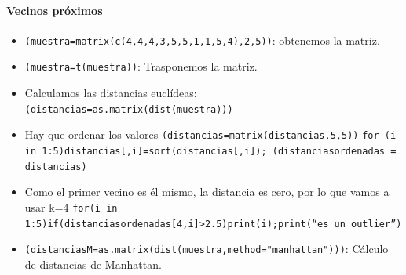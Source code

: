\documentclass[a4paper, 12pt]{article}
\begin{document}
	\paragraph{Vecinos próximos}
	\begin{itemize}
		\item \texttt{(muestra=matrix(c(4,4,4,3,5,5,1,1,5,4),2,5))}: obtenemos la matriz.
		\item \texttt{(muestra=t(muestra))}: Trasponemos la matriz.
		\item Calculamos las distancias euclídeas: \texttt{(distancias=as.matrix(dist(muestra)))}
		\item Hay que ordenar los valores \texttt{(distancias=matrix(distancias,5,5))} \texttt{for (i in 1:5){distancias[,i]=sort(distancias[,i])}; (distanciasordenadas = distancias)}
		\item Como el primer vecino es él mismo, la distancia es cero, por lo que vamos a usar k=4 \texttt{for(i in 1:5){if(distanciasordenadas[4,i]>2.5){print(i);print(``es un outlier'')}}}
		\item \texttt{(distanciasM=as.matrix(dist(muestra,method="manhattan")))}: Cálculo de distancias de Manhattan.
	\end{itemize}
\end{document}
